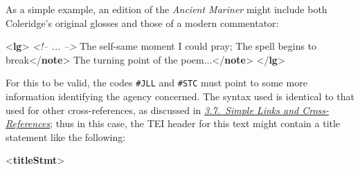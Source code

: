 As a simple example, an edition of the \textit{Ancient Mariner} might include both Coleridge's original glosses and those of a modern commentator: \par\bgroup{}\exampleFont \begin{shaded}\noindent\mbox{}{<\textbf{lg}>}\mbox{}\newline 
\textit{<!-- ... -->}\mbox{}\newline 
{}The self-same moment I could pray;\mbox{}\newline 
{}The spell begins to break{</\textbf{note}>}\mbox{}\newline 
\hspace*{1em}The turning point of the poem...{</\textbf{note}>}\mbox{}\newline 
{}\mbox{}\newline 
{</\textbf{lg}>}\end{shaded}\egroup\par \noindent  For this to be valid, the codes \texttt{\#JLL} and \texttt{\#STC} must point to some more information identifying the agency concerned. The syntax used is identical to that used for other cross-references, as discussed in \textit{\hyperref[COXR]{3.7.\ Simple Links and Cross-References}}; thus in this case, the TEI header for this text might contain a title statement like the following: \par\bgroup{}\exampleFont \begin{shaded}\noindent\mbox{}{<\textbf{titleStmt}>}\mbox{}\newline 

\end{shaded}
